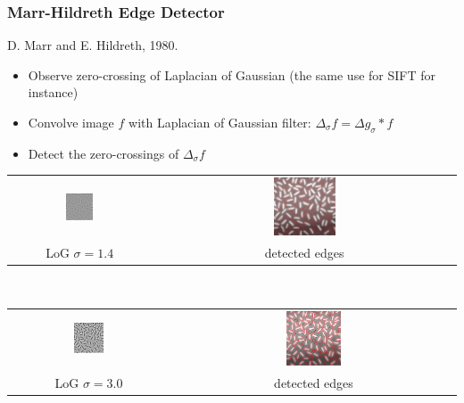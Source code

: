\documentclass[10pt]{beamer}
\begin{document}
\begin{frame}
  \frametitle{Marr-Hildreth Edge Detector}
  D. Marr and E. Hildreth, 1980.
  \begin{itemize}
  \item Observe zero-crossing of Laplacian of Gaussian (the same use for SIFT for instance)
  \item Convolve image $f$ with Laplacian of Gaussian filter: $\Delta_\sigma f = \Delta g_\sigma \ast f$  
  \item Detect the zero-crossings of $\Delta_\sigma f$
  \end{itemize}
  \begin{center}
    \begin{tabular}[h]{cc}
      \includegraphics[width = 0.2\textwidth]{IMAGES/lorice1_4}& 
      \includegraphics[width = 0.21\textwidth]{IMAGES/riceedges1_4mh}\\
      LoG $\sigma = 1.4$ & detected edges
    \end{tabular}\\
    \begin{tabular}[h]{cc}
      \includegraphics[width = 0.2\textwidth]{IMAGES/lorice3_0}& 
      \includegraphics[width = 0.2\textwidth, height = 0.2\textwidth]{IMAGES/riceedges3_0mh}\\
      LoG $\sigma = 3.0$ & detected edges
    \end{tabular}\\
  \end{center}
\end{frame}
\end{document}
